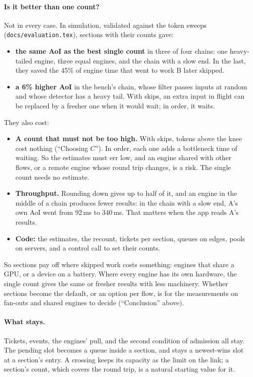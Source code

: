 \documentclass[11pt]{article}
\newcommand{\code}[1]{\texttt{#1}}
\begin{document}
\paragraph{Is it better than one count?} Not in every case. In simulation,
validated against the token sweeps (\code{docs/evaluation.tex}), sections
with their counts gave:
\begin{itemize}[nosep]
  \item \textbf{the same AoI as the best single count} in three of four
        chains: one heavy-tailed engine, three equal engines, and the chain
        with a slow end. In the last, they saved the 45\% of engine time
        that went to work B later skipped.
  \item \textbf{a 6\% higher AoI} in the bench's chain, whose filter passes
        inputs at random and whose detector has a heavy tail. With skips, an
        extra input in flight can be replaced by a fresher one when it would
        wait; in order, it waits.
\end{itemize}
They also cost:
\begin{itemize}[nosep]
  \item \textbf{A count that must not be too high.} With skips, tokens
        above the knee cost nothing (``Choosing $C$''). In order, each one
        adds a bottleneck time of waiting. So the estimates must err low,
        and an engine shared with other flows, or a remote engine whose
        round trip changes, is a risk. The single count needs no estimate.
  \item \textbf{Throughput.} Rounding down gives up to half of it, and an
        engine in the middle of a chain produces fewer results: in the chain
        with a slow end, A's own AoI went from 92\,ms to 340\,ms. That
        matters when the app reads A's results.
  \item \textbf{Code:} the estimates, the recount, tickets per section,
        queues on edges, pools on servers, and a control call to set their
        counts.
\end{itemize}
So sections pay off where skipped work costs something: engines that share
a GPU, or a device on a battery. Where every engine has its own hardware,
the single count gives the same or fresher results with less machinery.
Whether sections become the default, or an option per flow, is for the
measurements on fan-outs and shared engines to decide (``Conclusion''
above).

\paragraph{What stays.} Tickets, events, the engines' pull, and the second
condition of admission all stay. The pending slot becomes a queue inside a
section, and stays a newest-wins slot at a section's entry. A crossing keeps
its capacity as the limit on the link; a section's count, which covers the
round trip, is a natural starting value for it.
\end{document}
